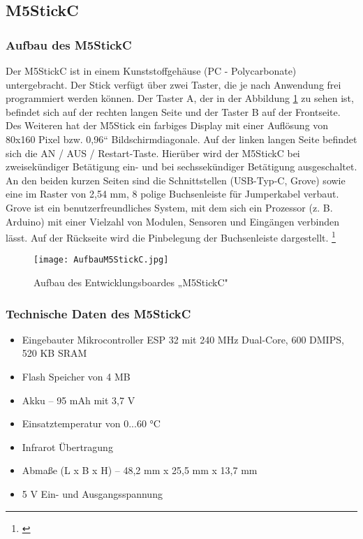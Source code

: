 \documentclass[a4paper,12pt]{article}
\begin{document}
\newpage

\subsection{M5StickC}
\subsubsection{Aufbau des M5StickC}
Der M5StickC ist in einem Kunststoffgehäuse (PC - Polycarbonate) untergebracht. Der Stick verfügt über zwei Taster, die je nach Anwendung frei programmiert werden können. Der Taster A, der in der Abbildung \ref{AufbauM5StickC} zu sehen ist, befindet sich auf der rechten langen Seite und der Taster B auf der Frontseite. Des Weiteren hat der M5Stick ein farbiges Display mit einer Auflösung von 80x160 Pixel bzw. 0,96“ Bildschirmdiagonale. Auf der linken langen Seite befindet sich die AN / AUS / Restart-Taste. Hierüber wird der M5StickC bei zweisekündiger Betätigung ein- und bei sechssekündiger Betätigung ausgeschaltet.  An den beiden kurzen Seiten sind die Schnittstellen (USB-Typ-C, Grove) sowie eine im Raster von 2,54 mm, 8 polige Buchsenleiste für Jumperkabel verbaut. Grove ist ein benutzerfreundliches System, mit dem sich ein Prozessor (z. B. Arduino) mit einer Vielzahl von Modulen, Sensoren und Eingängen verbinden lässt. Auf der Rückseite wird die Pinbelegung der Buchsenleiste dargestellt. \footnote{\cite{M5STACK.}}

\begin{figure}[H]	%
\begin{center}
\texttt{[image: AufbauM5StickC.jpg]}
\caption{Aufbau des Entwicklungsboardes „M5StickC" \protect\cite{M5STACK.}}
\label{AufbauM5StickC}
\end{center}
\end{figure}

\newpage

\subsubsection{Technische Daten des M5StickC}
\begin{itemize}
\item Eingebauter Mikrocontroller ESP 32 mit 240 MHz Dual-Core, 600 DMIPS, 520 KB SRAM
\item Flash Speicher von 4 MB
\item Akku – 95 mAh mit 3,7 V
\item Einsatztemperatur von 0...60 °C
\item Infrarot Übertragung
\item Abmaße (L x B x H) – 48,2 mm x 25,5 mm x 13,7 mm
\item 5 V Ein- und Ausgangsspannung
\end{itemize}
\end{document}
